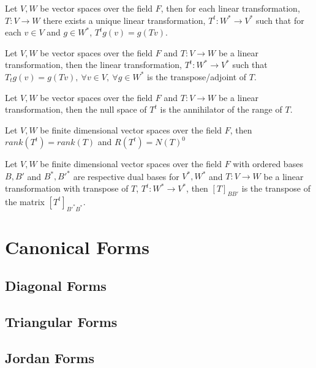 	\begin{theorem}
		Let $V,W$ be vector spaces over the field $F$, then for each linear transformation, $T : V \to W$ there exists a unique linear transformation, $T^t : W^* \to V^*$ such that for each $v \in V$ and $g \in W^*$, $T^tg (v) = g(Tv)$.
	\end{theorem}
	\begin{definition}
		Let $V,W$ be vector spaces over the field $F$ and $T : V \to W$ be a linear transformation, then the linear transformation, $T^t : W^* \to V^*$ such that $T_tg(v) = g(Tv),\ \forall v \in V,\ \forall g \in W^*$ is the transpose/adjoint of $T$.
	\end{definition}
	\begin{theorem}
		Let $V,W$ be vector spaces over the field $F$ and $T: V \to W$ be a linear transformation, then the null space of $T^t$ is the annihilator of the range of $T$.
	\end{theorem}
	\begin{corollary}
		Let $V,W$ be finite dimensional vector spaces over the field $F$, then $rank(T^t) = rank(T)$ and $R(T^t) = N(T)^0$
	\end{corollary}
	\begin{theorem}
		Let $V,W$ be finite dimensional vector spaces over the field $F$ with ordered bases $B,B'$ and $B^*, B'^*$ are respective dual bases for $V^*,W^*$ and $T: V \to W$ be a linear transformation with transpose of $T$, $T^t : W^* \to V^*$, then $[T]_{BB'}$ is the transpose of the matrix $[T^t]_{B'^*B^*}$.
	\end{theorem}


\section{Canonical Forms}

\subsection{Diagonal Forms}
\subsection{Triangular Forms}
\subsection{Jordan Forms}
